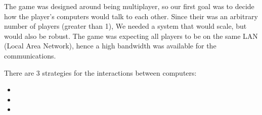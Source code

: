 The game was designed around being multiplayer, so our first goal was to decide how the player's computers would talk to each other.
Since their was an arbitrary number of players (greater than 1), We needed a system that would scale, but would also be robust.
The game was expecting all players to be on the same LAN (Local Area Network), hence a high bandwidth was available for the communications.

There are 3 strategies for the interactions between computers:
\begin{itemize}
\item \stepOneName
\item \stepTwoName
\item \stepThreeName
\end{itemize}


